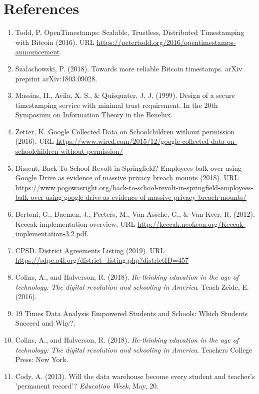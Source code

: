 \documentclass{article}
\begin{document}
\section{References}
\begin{enumerate}
    \label{sec:1}
    \item Todd, P. OpenTimestamps: Scalable, Trustless, Distributed Timestamping with Bitcoin (2016). URL \url{https://petertodd.org/2016/opentimestamps-announcement}
    \label{sec:2}
    \item Szalachowski, P. (2018). Towards more reliable Bitcoin timestamps. arXiv preprint arXiv:1803.09028.
    \label{sec:3}
    \item Massias, H., Avila, X. S., \& Quisquater, J. J. (1999). Design of a secure timestamping service with minimal trust requirement. In the 20th Symposium on Information Theory in the Benelux.
    \label{sec:4}
    \item Zetter, K. Google Collected Data on Schoolchildren without permission (2016). URL \url{https://www.wired.com/2015/12/google-collected-data-on-schoolchildren-without-permission/}
    \label{sec:5}
    \item Dissent, Back-To-School Revolt in Springfield? Employees balk over using Google Drive as evidence of massive privacy breach mounts (2018).  URL \url{https://www.pogowasright.org/back-to-school-revolt-in-springfield-employees-balk-over-using-google-drive-as-evidence-of-massive-privacy-breach-mounts/}
    \label{sec:6}
    \item Bertoni, G., Daemen, J., Peeters, M., Van Assche, G., \& Van Keer, R. (2012). Keccak implementation overview. URL  \url{http://keccak.neokeon.org/Keccak-implementation-3.2.pdf}.
    \label{sec:7}
    \item CPSD. District Agreements Listing (2019). URL  \url{https://sdpc.a4l.org/district_listing.php?districtID=457}
    \label{sec:8}
    \item Colins, A., and Halverson, R. (2018).\textit{ Re-thinking education in the age of technology: The digital revolution and schooling in America}. Teach Zeide, E. (2016).
    \label{sec:9}
    \item 19 Times Data Analysis Empowered Students and Schools: Which Students Succeed and Why?.
    \label{sec:10}
    \item Colins, A., and Halverson, R. (2018).\textit{ Re-thinking education in the age of technology: The digital revolution and schooling in America}. Teachers College Press: New York.
    \label{sec:11}
    \item Cody, A. (2013). Will the data warehouse become every student and teacher's 'permanent record'? \textit{Education Week}, May, 20.

\end{enumerate}
\end{document}
